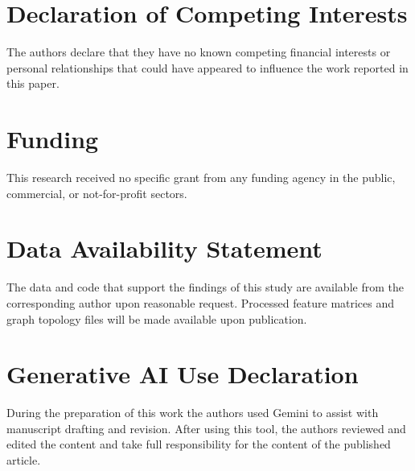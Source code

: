 \documentclass[preprint,12pt]{elsarticle}
\begin{document}
\section*{Declaration of Competing Interests}
The authors declare that they have no known competing financial interests or personal relationships that could have appeared to influence the work reported in this paper.

\section*{Funding}
This research received no specific grant from any funding agency in the public, commercial, or not-for-profit sectors.

\section*{Data Availability Statement}
The data and code that support the findings of this study are available from the corresponding author upon reasonable request. Processed feature matrices and graph topology files will be made available upon publication.

\section*{Generative AI Use Declaration}
During the preparation of this work the authors used Gemini to assist with manuscript drafting and revision. After using this tool, the authors reviewed and edited the content and take full responsibility for the content of the published article.




\end{document}
